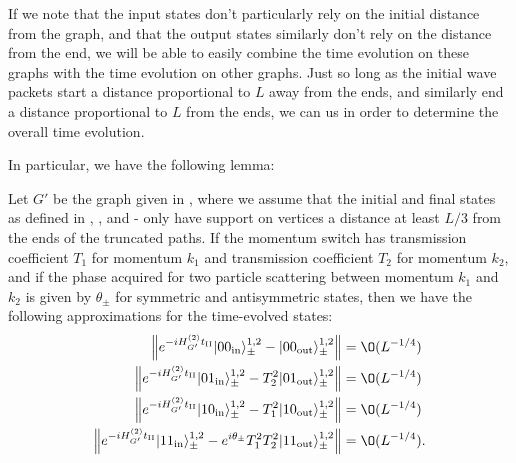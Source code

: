 \documentclass[../thesis-main/thesis-main]{subfiles}
\begin{document}
If we note that the input states don't particularly rely on the initial distance from the graph, and that the output states similarly don't rely on the distance from the end, we will be able to easily combine the time evolution on these graphs with the time evolution on other graphs.  Just so long as the initial wave packets start a distance proportional to $L$ away from the ends, and similarly end a distance proportional to $L$ from the ends, we can us  in order to determine the overall time evolution.



In particular, we have the following lemma:
\begin{lemma}
Let $G'$ be the graph given in , where we assume that the initial and final states as defined in , , and - only have support on vertices a distance at least $L/3$ from the ends of the truncated paths.  If the momentum switch has transmission coefficient $T_1$ for momentum $k_1$ and transmission coefficient $T_2$ for momentum $k_2$, and if the phase acquired for two particle scattering between momentum $k_1$ and $k_2$ is given by $\theta_{\pm}$ for symmetric and antisymmetric states, then we have the following approximations for the time-evolved states:
\begin{align}
  \left\Vert e^{-iH_{G'}^{(2)}t_{\mathrm{II}}}|00_{\text{in}}\rangle_{\pm}^{1,2}-|00_{\text{out}}\rangle_{\pm}^{1,2}\right\Vert  & = \O(L^{-{1}/{4}})\label{eq:bound00}\\
  \left\Vert e^{-iH_{G'}^{(2)}t_{\mathrm{II}}}|01_{\text{in}}\rangle_{\pm}^{1,2}-T_{2}^2|01_{\text{out}}\rangle_{\pm}^{1,2}\right\Vert  & = \O(L^{-{1}/{4}})\label{eq:bound01}\\
  \left\Vert e^{-iH_{G'}^{(2)}t_{\mathrm{II}}}|10_{\text{in}}\rangle_{\pm}^{1,2}-T_1^2|10_{\text{out}}\rangle_{\pm}^{1,2}\right\Vert  & = \O(L^{-{1}/{4}})\label{eq:bound10}\\
  \left\Vert e^{-iH_{G'}^{(2)}t_{\mathrm{II}}}|11_{\text{in}}\rangle_{\pm}^{1,2} - e^{i\theta_{\pm}}T_1^2T_2^2|11_{\text{out}}\rangle_{\pm}^{1,2}\right\Vert  & = \O(L^{-{1}/{4}}).\label{eq:bound11}
\end{align}
\label{lem:cd_bounds}
\end{lemma}
\end{document}
